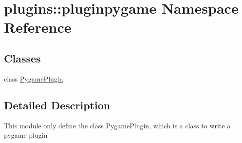 \hypertarget{namespaceplugins_1_1pluginpygame}{\section{plugins\-:\-:pluginpygame \-Namespace \-Reference}
\label{namespaceplugins_1_1pluginpygame}
}
\subsection*{\-Classes}
\begin{DoxyCompactItemize}
\item 
class \hyperlink{classplugins_1_1pluginpygame_1_1_pygame_plugin}{\-Pygame\-Plugin}
\end{DoxyCompactItemize}


\subsection{\-Detailed \-Description}
\begin{DoxyVerb}
    This module only define the class PygamePlugin,
    which is a class to write a pygame plugin
\end{DoxyVerb}
 